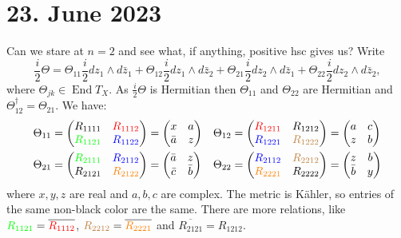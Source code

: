 \documentclass[11pt]{article}
\theoremstyle{definition}
\def\ov#1{\overline{#1}}
\DeclareMathOperator{\End}{End}
\begin{document}
\section{23. June 2023}

Can we stare at $n = 2$ and see what, if anything, positive hsc gives us?
Write
$$
\frac i2 \Theta
= \Theta_{11} \frac i2 dz_1 \wedge d\bar z_1
+ \Theta_{12} \frac i2 dz_1 \wedge d\bar z_2
+ \Theta_{21} \frac i2 dz_2 \wedge d\bar z_1
+ \Theta_{22} \frac i2 dz_2 \wedge d\bar z_2,
$$
where $\Theta_{jk} \in \End T_X$.
As $\frac i2 \Theta$ is Hermitian then $\Theta_{11}$ and $\Theta_{22}$ are
Hermitian and $\Theta_{12}^\dagger = \Theta_{21}$.
We have:
\begin{align*}
\Theta_{11} &=
\begin{pmatrix}
R_{1111} & \color{red}{{R_{1112}}}
\\
\color{green}{R_{1121}} & \color{blue}{R_{1122}}
\end{pmatrix}
= \begin{pmatrix}
x & a
\\
\bar a & z
\end{pmatrix}
	    &
\Theta_{12} &=
\begin{pmatrix}
\color{red}{{R_{1211}}} & R_{1212}
\\
\color{blue}{R_{1221}} & \color{brown}{R_{1222}}
\end{pmatrix}
= \begin{pmatrix}
a & c
\\
z & b
\end{pmatrix}
\\
\Theta_{21} &=
\begin{pmatrix}
\color{green}{R_{2111}} & \color{blue}{R_{2112}}
\\
R_{2121} & \color{orange}{R_{2122}}
\end{pmatrix}
= \begin{pmatrix}
\bar a & z
\\
\bar c & \bar b
\end{pmatrix}
	    &
\Theta_{22} &=
\begin{pmatrix}
\color{blue}{R_{2112}} & \color{brown}{R_{2212}}
\\
\color{orange}{R_{2221}} & R_{2222}
\end{pmatrix}
= \begin{pmatrix}
z & b
\\
\bar b & y
\end{pmatrix}
\end{align*}
where $x,y,z$ are real and $a, b, c$ are complex.
The metric is K\"ahler, so entries of the same non-black color are the same.
There are more relations, like ${\color{green} R_{1121}} =
\ov{\color{red}{R_{1112}}}$,
${\color{brown} R_{2212}} = \ov{\color{orange} R_{2221}}$
and $\ov{R_{2121}} = R_{1212}$.
\end{document}
